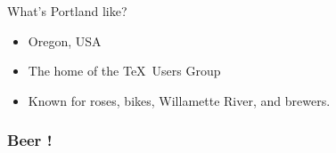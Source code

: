 \documentclass[17pt,dvipdfmx]{beamer}
\begin{document}
{%
\begin{frame}[t]{{\color{black}What's Portland like?}}
  \bfseries\rmfamily
  \begin{itemize}
    \item Oregon, USA
    \item The home of the \TeX\ Users Group
    \item Known for roses, bikes, Willamette River, and brewers.
  \end{itemize}
  \vfill
\end{frame}
}

{%
\frame
{
  \frametitle{{\color{white}Beer !}}
  \bfseries\rmfamily
  \begin{center}

  \end{center}
  \vfill
}}
\end{document}
